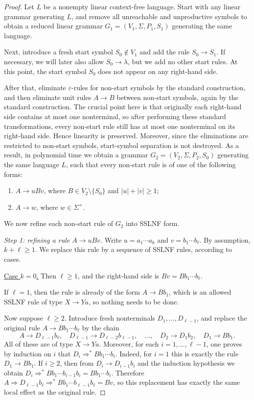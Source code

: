 \documentclass[11pt,a4paper]{article}
\begin{document}
\begin{proof}
Let $L$ be a nonempty linear context-free language. Start with any linear grammar generating $L$, and remove all unreachable and unproductive symbols to obtain a reduced linear grammar $G_1=(V_1,\Sigma,P_1,S_1)$ generating the same language.

Next, introduce a fresh start symbol $S_0\notin V_1$ and add the rule $S_0\to S_1$. If necessary, we will later also allow $S_0\to\lambda$, but we add no other start rules. At this point, the start symbol $S_0$ does not appear on any right-hand side.

After that, eliminate $\varepsilon$-rules for non-start symbols by the standard construction, and then eliminate unit rules $A\to B$ between non-start symbols, again by the standard construction. The crucial point here is that originally each right-hand side contains at most one nonterminal, so after performing these standard transformations, every non-start rule still has at most one nonterminal on its right-hand side. Hence linearity is preserved. Moreover, since the eliminations are restricted to non-start symbols, start-symbol separation is not destroyed. As a result, in polynomial time we obtain a grammar $G_2=(V_2,\Sigma,P_2,S_0)$ generating the same language $L$, such that every non-start rule is of one of the following forms:
\begin{enumerate}[label=\textup{(\arabic*)},nosep,leftmargin=2.2em]
\item $A\to uBv$, where $B\in V_2\setminus\{S_0\}$ and $|u|+|v|\ge 1$;
\item $A\to w$, where $w\in\Sigma^+$.
\end{enumerate}
We now refine each non-start rule of $G_2$ into SSLNF form.

\smallskip\noindent\emph{Step 1: refining a rule $A\to uBv$.}
Write $u=a_1\cdots a_k$ and $v=b_1\cdots b_\ell$. By assumption, $k+\ell\ge 1$. We replace this rule by a sequence of SSLNF rules, according to cases.

\smallskip\noindent\underline{Case $k=0$.}
Then $\ell\ge 1$, and the right-hand side is $Bv=Bb_1\cdots b_\ell$.

If $\ell=1$, then the rule is already of the form $A\to Bb_1$, which is an allowed SSLNF rule of type $X\to Ya$, so nothing needs to be done.

Now suppose $\ell\ge 2$. Introduce fresh nonterminals $D_1,\dots,D_{\ell-1}$, and replace the original rule $A\to Bb_1\cdots b_\ell$ by the chain
\[
A\to D_{\ell-1}b_\ell,\quad
D_{\ell-1}\to D_{\ell-2}b_{\ell-1},\quad
\dots,\quad
D_2\to D_1b_2,\quad
D_1\to Bb_1.
\]
All of these are of type $X\to Ya$. Moreover, for each $i=1,\dots,\ell-1$, one proves by induction on $i$ that $D_i\Rightarrow^* Bb_1\cdots b_i$. Indeed, for $i=1$ this is exactly the rule $D_1\to Bb_1$. If $i\ge 2$, then from $D_i\to D_{i-1}b_i$ and the induction hypothesis we obtain $D_i\Rightarrow^* Bb_1\cdots b_{i-1}b_i=Bb_1\cdots b_i$. Therefore
$A\Rightarrow D_{\ell-1}b_\ell \Rightarrow^* Bb_1\cdots b_{\ell-1}b_\ell=Bv$,
so this replacement has exactly the same local effect as the original rule.


\end{proof}
\end{document}
